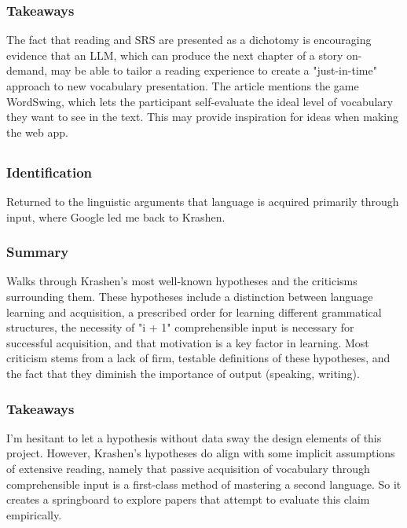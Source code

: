 \documentclass[
	letterpaper, %
]{jdf}
\begin{document}
\subsubsection{Takeaways}
The fact that reading and SRS are presented as a dichotomy is encouraging evidence that an LLM, which can produce the next chapter of a story on-demand, may be able to tailor a reading experience to create a "just-in-time" approach to new vocabulary presentation. The article mentions the game WordSwing, which lets the participant self-evaluate the ideal level of vocabulary they want to see in the text. This may provide inspiration for ideas when making the web app.

\subsection{}
\subsubsection{Identification}
Returned to the linguistic arguments that language is acquired primarily through input, where Google led me back to Krashen.

\subsubsection{Summary}
Walks through Krashen's most well-known hypotheses and the criticisms surrounding them. These hypotheses include a distinction between language learning and acquisition, a prescribed order for learning different grammatical structures, the necessity of "i + 1" comprehensible input is necessary for successful acquisition, and that motivation is a key factor in learning. Most criticism stems from a lack of firm, testable definitions of these hypotheses, and the fact that they diminish the importance of output (speaking, writing).

\subsubsection{Takeaways}
I'm hesitant to let a hypothesis without data sway the design elements of this project. However, Krashen's hypotheses do align with some implicit assumptions of extensive reading, namely that passive acquisition of vocabulary through comprehensible input is a first-class method of mastering a second language. So it creates a springboard to explore papers that attempt to evaluate this claim empirically.
\end{document}
